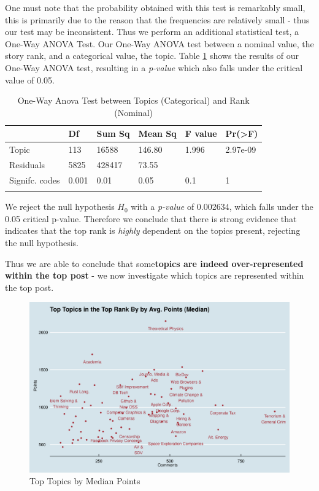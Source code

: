 \documentclass[11pt,journal,final,a4paper]{IEEEtran}
\begin{document}
One must note that the probability obtained with this test is remarkably small, this is primarily due to the reason that the frequencies are relatively small - thus our test may be inconsistent. Thus we perform an additional statistical test, a One-Way ANOVA Test. Our One-Way ANOVA test between a nominal value, the story rank, and a categorical value, the topic. Table \ref{tab:anova} shows the results of our One-Way ANOVA test, resulting in a \textit{p-value} which also falls under the critical value of 0.05.

\begin{table}[!ht]
\centering
\scriptsize
\begin{tabular}{llllll}
\hline
               & Df    & Sum Sq & Mean Sq & F value & Pr(\textgreater{}F) \\ \hline
Topic          & 113   & 16588  & 146.80  & 1.996   & 2.97e-09            \\ \hline
Residuals      & 5825  & 428417 & 73.55   &         &                     \\ \hline
Signifc. codes & 0.001 & 0.01   & 0.05    & 0.1     & 1                   \\ \hline
\\
\end{tabular}
\caption{One-Way Anova Test between Topics (Categorical) and Rank (Nominal)}
\label{tab:anova}
\end{table}

We reject the null hypothesis $H_{0}$ with a \textit{p-value} of 0.002634, which falls under the 0.05 critical p-value. Therefore we conclude that there is strong evidence that indicates that the top rank is \textit{highly} dependent on the topics present, rejecting the null hypothesis. 

Thus we are able to conclude that some\textbf{topics are indeed over-represented within the top post} - we now investigate which topics are represented within the top post.

\begin{figure}[!ht]
\centerline{\includegraphics[scale=0.4]{img/topic_model_02_top_post_ranking_med.png}}
\caption{Top Topics by Median Points}
\label{toptopicsmedpoints}
\end{figure}
\end{document}
